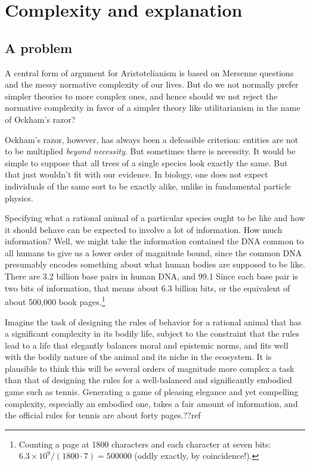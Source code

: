 
\section{Complexity and explanation}\label{sec:hierarchy}
\subsection{A problem}
A central form of argument for Aristotelianism is based on Mersenne questions and the messy normative complexity of our
lives. But do we not normally prefer simpler theories to more complex ones, and hence should we not reject the normative
complexity in favor of a simpler theory like utilitarianism in the name of Ockham's razor?

Ockham's razor, however, has always been a defeasible criterion: entities are not to be multiplied \textit{beyond necessity}.
But sometimes there is necessity. It would be simple to suppose that all trees of a single species look exactly the same.
But that just wouldn't fit with our evidence. In biology, one does not expect individuals of the same sort to be exactly
alike, unlike in fundamental particle physics. 

Specifying what a rational animal of a particular species ought to be like
and how it should behave can be expected to involve a lot of information. How much information? Well, we might take the information contained
the DNA common to all humans to give us a lower order of magnitude bound, since the common DNA presumably encodes something
about what human bodies are supposed to be like. There are 3.2 billion base pairs in human DNA, and 
99.1%
Since each base pair is two bits of information, that means about 6.3 billion bits, or the equivalent of about 500,000
book pages.\footnote{Counting a page at 1800 characters and each character at seven bits: $6.3\times 10^9/(1800\cdot 7)=500000$
(oddly exactly, by coincidence!).} 

Imagine the task of designing the rules of behavior for a rational animal that has a significant complexity in its bodily
life, subject to the constraint that the rules lead to a life that elegantly balances moral and epistemic norms, and fits
well with the bodily nature of the animal and its niche in the ecosystem. It is plausible to think this will be several
orders of magnitude more complex a task than that of designing the rules for a well-balanced and significantly embodied game 
such as tennis. Generating a game of pleasing elegance and yet compelling complexity, especially an embodied one, takes a 
fair amount of information, and the official rules for tennis are about forty pages.??ref 

